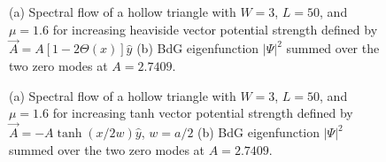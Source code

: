 \begin{figure}[!ht]
  \caption{(a) Spectral flow of a hollow triangle with $W=3$, $L=50$, and $\mu=1.6$ for increasing heaviside vector potential strength defined by $\vec{A} = A [1-2\Theta(x)] \hat{y}$ (b) BdG eigenfunction $|\Psi|^2$ summed over the two zero modes at $A = 2.7409$.}
  \label{fig: heaviside-increasing-w-3}
\end{figure}

\begin{figure}[!ht]
  \caption{(a) Spectral flow of a hollow triangle with $W=3$, $L=50$, and $\mu=1.6$ for increasing tanh vector potential strength defined by $\vec{A} = -A \tanh(x / 2w)\hat{y}$, $w=a/2$ (b) BdG eigenfunction $|\Psi|^2$ summed over the two zero modes at $A = 2.7409$.}
  \label{fig: tanh-increasing-w-3}
\end{figure}


